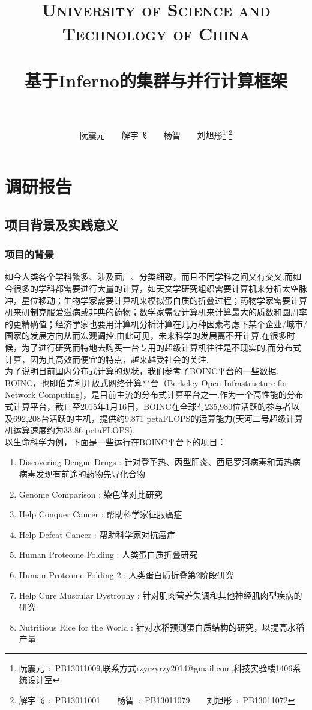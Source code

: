 \documentclass[paper=a4]{ctexart} %
\title{
  \normalfont \normalsize 
  \textsc{\\~\\~\\~\\~\\~\\University of Science and Technology of China} \\ [25pt] %
  \horrule{0.5pt} \\[0.4cm] %
  \huge 基于Inferno的集群与并行计算框架 \\ %
  \horrule{2pt} \\[0.5cm] %
}
\author{\Large{阮震元~~~~解宇飞~~~~杨智~~~~刘旭彤}\footnote{阮震元~:~PB13011009,联系方式rzyrzyrzy2014@gmail.com,科技实验楼1406系统设计室}
\setcounter{footnote}{-1}
\footnote{解宇飞~:~PB13011001~~~~杨智~:~PB13011079~~~~刘旭彤~:~PB13011072}
} %
\date{} %
\numberwithin{equation}{section} %
\numberwithin{figure}{section} %
\numberwithin{table}{section} %
\newcommand{\n}{\\\indent}
\begin{document}
\maketitle %

\clearpage
\setcounter{section}{0}
\setcounter{subsection}{0}
\setcounter{subsubsection}{0}
\tableofcontents
\clearpage

\section{调研报告}

\subsection{项目背景及实践意义}

\subsubsection{项目的背景}
如今人类各个学科繁多、涉及面广、分类细致，而且不同学科之间又有交叉.而如今很多的学科都需要进行大量的计算，如天文学研究组织需要计算机来分析太空脉冲，星位移动；生物学家需要计算机来模拟蛋白质的折叠过程；药物学家需要计算机来研制克服爱滋病或非典的药物；数学家需要计算机来计算最大的质数和圆周率的更精确值；经济学家也要用计算机分析计算在几万种因素考虑下某个企业/城市/国家的发展方向从而宏观调控.由此可见，未来科学的发展离不开计算.在很多时候，为了进行研究而特地去购买一台专用的超级计算机往往是不现实的.而分布式计算，因为其高效而便宜的特点，越来越受社会的关注.\n
为了说明目前国内分布式计算的现状，我们参考了BOINC平台的一些数据. \n
BOINC，也即伯克利开放式网络计算平台（Berkeley Open Infrastructure for Network Computing)，是目前主流的分布式计算平台之一.作为一个高性能的分布式计算平台，截止至2015年1月16日，BOINC在全球有235,980位活跃的参与者以及692,208台活跃的主机，提供约9.871 petaFLOPS的运算能力(天河二号超级计算机运算速度约为33.86 petaFLOPS).\n
以生命科学为例，下面是一些运行在BOINC平台下的项目：
\begin{enumerate}
\item Discovering Dengue Drugs : 针对登革热、丙型肝炎、西尼罗河病毒和黄热病病毒发现有前途的药物先导化合物
\item Genome Comparison : 染色体对比研究
\item Help Conquer Cancer : 帮助科学家征服癌症
\item Help Defeat Cancer : 帮助科学家对抗癌症
\item Human Proteome Folding : 人类蛋白质折叠研究 
\item Human Proteome Folding 2 : 人类蛋白质折叠第2阶段研究
\item Help Cure Muscular Dystrophy : 针对肌肉营养失调和其他神经肌肉型疾病的研究
\item Nutritious Rice for the World : 针对水稻预测蛋白质结构的研究，以提高水稻产量
\end{enumerate}
\end{document}
